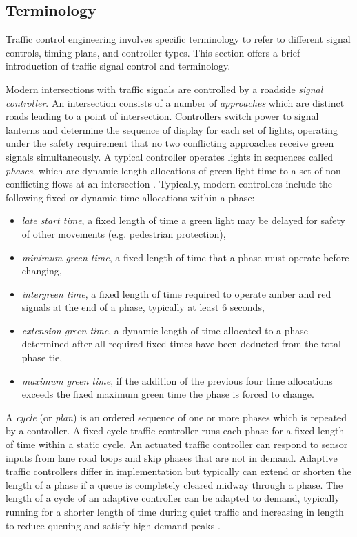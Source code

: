 \begin{appendices}

\chapter{Terminology}
\label{appendix:terminology}

Traffic control engineering involves specific terminology to refer to different signal controls, timing plans, and controller types. This section offers a brief introduction of traffic signal control and terminology.

Modern intersections with traffic signals are controlled by a roadside \emph{signal controller}. An intersection consists of a number of \emph{approaches} which are distinct roads leading to a point of intersection. Controllers switch power to signal lanterns and determine the sequence of display for each set of lights, operating under the safety requirement that no two conflicting approaches receive green signals simultaneously. A typical controller operates lights in sequences called \emph{phases}, which are dynamic length allocations of green light time to a set of non-conflicting flows at an intersection \cite{papa2003review}. Typically, modern controllers include the following fixed or dynamic time allocations within a phase:

\begin{itemize}
\item \emph{late start time}, a fixed length of time a green light may be delayed for safety of other movements (e.g. pedestrian protection),
\item \emph{minimum green time}, a fixed length of time that a phase must operate before changing,
\item \emph{intergreen time}, a fixed length of time required to operate amber and red signals at the end of a phase, typically at least 6 seconds,
\item \emph{extension green time}, a dynamic length of time allocated to a phase determined after all required fixed times have been deducted from the total phase tie,
\item \emph{maximum green time}, if the addition of the previous four time allocations exceeds the fixed maximum green time the phase is forced to change. 
\end{itemize}

A \emph{cycle} (or \emph{plan}) is an ordered sequence of one or more phases which is repeated by a controller. A fixed cycle traffic controller runs each phase for a fixed length of time within a static cycle. An actuated traffic controller can respond to sensor inputs from lane road loops and skip phases that are not in demand. Adaptive traffic controllers differ in implementation but typically can extend or shorten the length of a phase if a queue is completely cleared midway through a phase. The length of a cycle of an adaptive controller can be adapted to demand, typically running for a shorter length of time during quiet traffic and increasing in length to reduce queuing and satisfy high demand peaks \cite{scatstraining}.


\end{appendices}
